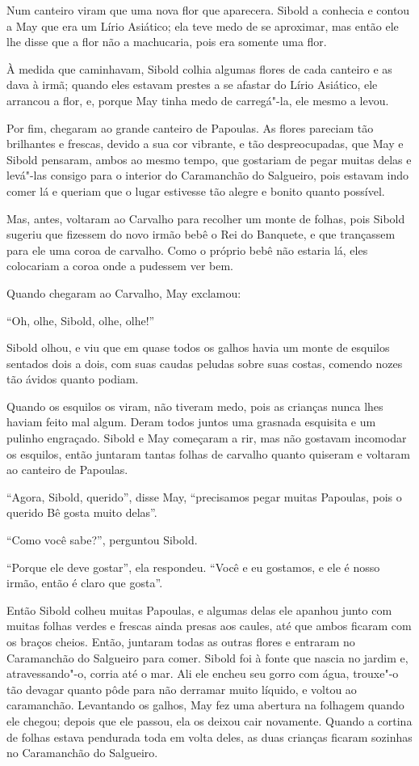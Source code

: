 Num canteiro viram que uma nova flor que aparecera. Sibold a conhecia e
contou a May que era um Lírio Asiático; ela teve medo de se aproximar,
mas então ele lhe disse que a flor não a machucaria, pois era somente
uma flor.

À medida que caminhavam, Sibold colhia algumas flores de cada canteiro e
as dava à irmã; quando eles estavam prestes a se afastar do Lírio
Asiático, ele arrancou a flor, e, porque May tinha medo de carregá"-la,
ele mesmo a levou.

Por fim, chegaram ao grande canteiro de Papoulas. As flores pareciam tão
brilhantes e frescas, devido a sua cor vibrante, e tão despreocupadas,
que May e Sibold pensaram, ambos ao mesmo tempo, que gostariam de pegar
muitas delas e levá"-las consigo para o interior do Caramanchão do
Salgueiro, pois estavam indo comer lá e queriam que o lugar estivesse
tão alegre e bonito quanto possível.

Mas, antes, voltaram ao Carvalho para recolher um monte de folhas, pois
Sibold sugeriu que fizessem do novo irmão bebê o Rei do Banquete, e que
trançassem para ele uma coroa de carvalho. Como o próprio bebê não
estaria lá, eles colocariam a coroa onde a pudessem ver bem.

Quando chegaram ao Carvalho, May exclamou:

``Oh, olhe, Sibold, olhe, olhe!''

Sibold olhou, e viu que em quase todos os galhos havia um monte de
esquilos sentados dois a dois, com suas caudas peludas sobre suas
costas, comendo nozes tão ávidos quanto podiam.

Quando os esquilos os viram, não tiveram medo, pois as crianças nunca
lhes haviam feito mal algum. Deram todos juntos uma grasnada esquisita e
um pulinho engraçado. Sibold e May começaram a rir, mas não gostavam
incomodar os esquilos, então juntaram tantas folhas de carvalho quanto
quiseram e voltaram ao canteiro de Papoulas.

``Agora, Sibold, querido'', disse May, ``precisamos pegar muitas
Papoulas, pois o querido Bê gosta muito delas''.

``Como você sabe?'', perguntou Sibold.

``Porque ele deve gostar'', ela respondeu. ``Você e eu gostamos, e ele é
nosso irmão, então é claro que gosta''.

Então Sibold colheu muitas Papoulas, e algumas delas ele apanhou junto
com muitas folhas verdes e frescas ainda presas aos caules, até que
ambos ficaram com os braços cheios. Então, juntaram todas as outras
flores e entraram no Caramanchão do Salgueiro para comer. Sibold foi à
fonte que nascia no jardim e, atravessando"-o, corria até o mar. Ali ele
encheu seu gorro com água, trouxe"-o tão devagar quanto pôde para não
derramar muito líquido, e voltou ao caramanchão. Levantando os galhos,
May fez uma abertura na folhagem quando ele chegou; depois que ele
passou, ela os deixou cair novamente. Quando a cortina de folhas estava
pendurada toda em volta deles, as duas crianças ficaram sozinhas no
Caramanchão do Salgueiro.


